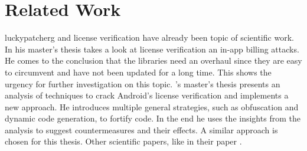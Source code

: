 \section{Related Work} \label{subsection:introduction-related}
\gls{luckypatcherg} and license verification have already been topic of scientific work.
\newline
In his master's thesis  \cite{bernhardSecurity} \citeauthor{bernhardSecurity} takes a look at license verification an in-app billing attacks.
He comes to the conclusion that the libraries need an overhaul since they are easy to circumvent and have not been updated for a long time.
This shows the urgency for further investigation on this topic.
\newline
\citeauthor{munteanLicense}'s master's thesis  \cite{munteanLicense} presents an analysis of techniques to crack Android's license verification and implements a new approach.
He introduces multiple general strategies, such as obfuscation and dynamic code generation, to fortify code.
In the end he uses the insights from the analysis to suggest countermeasures and their effects.
A similar approach is chosen for this thesis.
\newline
Other scientific papers, like \citeauthor{Jang:2013:PAA:2480362.2480673} in their paper .
